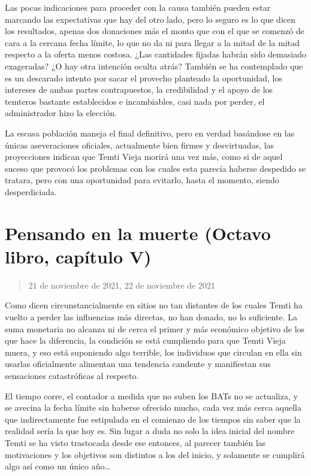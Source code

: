 \documentclass[
]{book}
\begin{document}
Las pocas indicaciones para proceder con la causa también pueden estar marcando las expectativas que hay del otro lado, pero lo seguro es lo que dicen los resultados, apenas dos donaciones más el monto que con el que se comenzó de cara a la cercana fecha límite, lo que no da ni para llegar a la mitad de la mitad respecto a la oferta menos costosa. ¿Las cantidades fijadas habrán sido demasiado exageradas? ¿O hay otra intención oculta atrás? También se ha contemplado que es un descarado intento por sacar el provecho planteado la oportunidad, los intereses de ambas partes contrapuestos, la credibilidad y el apoyo de los temteros bastante establecidos e incambiables, casi nada por perder, el administrador hizo la elección.

La escasa población maneja el final definitivo, pero en verdad basándose en las únicas aseveraciones oficiales, actualmente bien firmes y desvirtuadas, las proyecciones indican que Temti Vieja morirá una vez más, como si de aquel suceso que provocó los problemas con los cuales esta parecía haberse despedido se tratara, pero con una oportunidad para evitarlo, hasta el momento, siendo desperdiciada.

\hypertarget{pensando-en-la-muerte-octavo-libro-capuxedtulo-v}{%
\section{Pensando en la muerte (Octavo libro, capítulo V)}\label{pensando-en-la-muerte-octavo-libro-capuxedtulo-v}}

\begin{quote}
21 de noviembre de 2021, 22 de noviembre de 2021
\end{quote}

Como dicen circunstancialmente en sitios no tan distantes de los cuales Temti ha vuelto a perder las influencias más directas, no han donado, no lo suficiente. La suma monetaria no alcanza ni de cerca el primer y más económico objetivo de los que hace la diferencia, la condición se está cumpliendo para que Temti Vieja muera, y eso está suponiendo algo terrible, los individuos que circulan en ella sin usarlas oficialmente alimentan una tendencia candente y manifiestan sus sensaciones catastróficas al respecto.

El tiempo corre, el contador a medida que no suben los BATs no se actualiza, y se avecina la fecha límite sin haberse ofrecido mucho, cada vez más cerca aquella que indirectamente fue estipulada en el comienzo de los tiempos sin saber que la realidad sería la que hoy es. Sin lugar a duda no solo la idea inicial del nombre Temti se ha visto trastocada desde ese entonces, al parecer también las motivaciones y los objetivos son distintos a los del inicio, y solamente se cumplirá algo así como un único año\ldots{}
\end{document}
